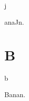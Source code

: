 \begin{multicols*}{2}
\begin{dictroot}{\bigglot}{j}
    \begin{dictentry}{{\bigglot}anaJ}{n.}
    \end{dictentry}
\end{dictroot}

\section*{B}

\begin{dictroot}{b}{\bigglot}
    \begin{dictentry}{Bana\bigglot}{n.}
    \end{dictentry}
\end{dictroot}


\end{multicols*}

